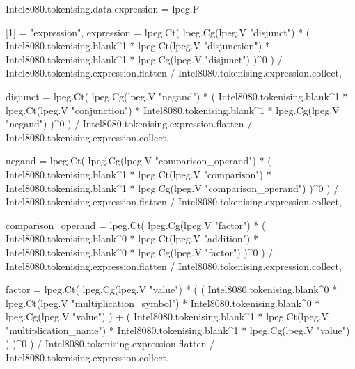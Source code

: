 Intel8080.tokenising.data.expression =
    lpeg.P {
        [1] = "expression",
        expression = lpeg.Ct(
            lpeg.Cg(lpeg.V "disjunct")
            * (
                Intel8080.tokenising.blank^1
                * lpeg.Ct(lpeg.V "disjunction")
                * Intel8080.tokenising.blank^1
                * lpeg.Cg(lpeg.V "disjunct")
            )^0
        ) / Intel8080.tokenising.expression.flatten / Intel8080.tokenising.expression.collect,

        disjunct = lpeg.Ct(
            lpeg.Cg(lpeg.V "negand")
            * (
                Intel8080.tokenising.blank^1
                * lpeg.Ct(lpeg.V "conjunction")
                * Intel8080.tokenising.blank^1
                * lpeg.Cg(lpeg.V "negand")
            )^0
        ) / Intel8080.tokenising.expression.flatten / Intel8080.tokenising.expression.collect,

        negand = lpeg.Ct(
            lpeg.Cg(lpeg.V "comparison_operand")
            * (
                Intel8080.tokenising.blank^1
                * lpeg.Ct(lpeg.V "comparison")
                * Intel8080.tokenising.blank^1
                * lpeg.Cg(lpeg.V "comparison_operand")
            )^0
        ) / Intel8080.tokenising.expression.flatten / Intel8080.tokenising.expression.collect,

        comparison_operand = lpeg.Ct(
            lpeg.Cg(lpeg.V "factor")
            * (
                Intel8080.tokenising.blank^0
                * lpeg.Ct(lpeg.V "addition")
                * Intel8080.tokenising.blank^0
                * lpeg.Cg(lpeg.V "factor")
            )^0
        ) / Intel8080.tokenising.expression.flatten / Intel8080.tokenising.expression.collect,

        factor = lpeg.Ct(
            lpeg.Cg(lpeg.V "value")
            * (
                (
                    Intel8080.tokenising.blank^0
                    * lpeg.Ct(lpeg.V "multiplication_symbol")
                    * Intel8080.tokenising.blank^0
                    * lpeg.Cg(lpeg.V "value")
                )
                +
                (
                    Intel8080.tokenising.blank^1
                    * lpeg.Ct(lpeg.V "multiplication_name")
                    * Intel8080.tokenising.blank^1
                    * lpeg.Cg(lpeg.V "value")
                )
            )^0
        ) / Intel8080.tokenising.expression.flatten / Intel8080.tokenising.expression.collect,

}
